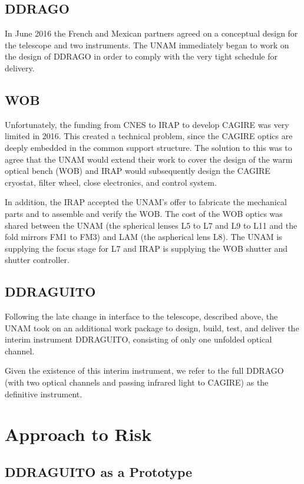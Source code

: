\documentclass{article}
\begin{document}
\subsection{DDRAGO}

In June 2016 the French and Mexican partners agreed on a conceptual design for the telescope and two instruments. The UNAM immediately began to work on the design of DDRAGO in order to comply with the very tight schedule for delivery. 

\subsection{WOB}

Unfortunately, the funding from CNES to IRAP to develop CAGIRE was very limited in 2016. This created a technical problem, since the CAGIRE optics are deeply embedded in the common support structure. The solution to this was to agree that the UNAM would extend their work to cover the design of the warm optical bench (WOB) and IRAP would subsequently design the CAGIRE cryostat, filter wheel, close electronics, and control system.

In addition, the IRAP accepted the UNAM’s offer to fabricate the mechanical parts and to assemble and verify the WOB. The cost of the WOB optics was shared between the UNAM (the spherical lenses L5 to L7 and L9 to L11 and the fold mirrors FM1 to FM3) and LAM (the aspherical lens L8). The UNAM is supplying the focus stage for L7 and IRAP is supplying the WOB shutter and shutter controller.

\subsection{DDRAGUITO}

Following the late change in interface to the telescope, described above, the UNAM took on an additional work package to design, build, test, and deliver the interim instrument DDRAGUITO, consisting of only one unfolded optical channel.

Given the existence of this interim instrument, we refer to the full DDRAGO (with two optical channels and passing infrared light to CAGIRE) as the definitive instrument.

\clearpage
\section{Approach to Risk}

\subsection{DDRAGUITO as a Prototype}
\end{document}
